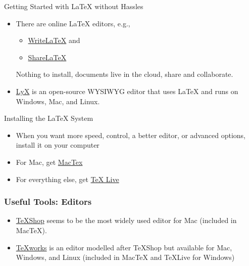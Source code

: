 
\begin{frame}{Getting Started with \LaTeX{} without Hassles}

\begin{itemize}
\item There are online \LaTeX{} editors, e.g.,
\begin{itemize}
\item \href{https://www.writelatex.com/}{WriteLaTeX} and 
\item \href{https://www.sharelatex.com/}{ShareLaTeX}
\end{itemize}
Nothing to install, documents live in the cloud, share and collaborate.
\item \href{http://www.lyx.org/}{LyX} is an open-source WYSIWYG editor
  that uses \LaTeX{} and runs on Windows, Mac, and Linux.
\end{itemize}

\end{frame}

\begin{frame}{Installing the \LaTeX{} System}

\begin{itemize}
\item When you want more speed, control, a better editor, or advanced 
options, install it on your computer
\item For Mac, get \href{http://www.tug.org/mactex/}{MacTex}
\item For everything else, get \href{http://www.tug.org/texlive/}{TeX Live}
\end{itemize}

\end{frame}

\begin{frame}
\frametitle{Useful Tools: Editors}

\begin{itemize}
\item \href{http://pages.uoregon.edu/koch/texshop/texshop.html}{TeXShop}
 seems to be the most widely used editor for Mac (included in MacTeX).
\item \href{http://www.tug.org/texworks/}{TeXworks} is an editor 
modelled after TeXShop but available for Mac, Windows, and Linux 
(included in MacTeX and TeXLive for Windows)
\end{itemize}

\end{frame}


